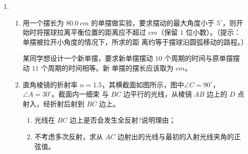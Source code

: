 \begin{enumerate}
\begin{enumerate}
\end{enumerate}





\newpage



\item 
\begin{enumerate}
\item
用一个摆长为 $ 80.0 \ cm $ 的单摆做实验，要求摆动的最大角度小于 $ 5 ^{ \circ } $，则开始时将摆球拉离平衡位置的距离应不超过 \underlinegap $ cm $（保留 $ 1 $ 位小数）。（提示：单摆被拉开小角度的情况下，所求的距
离约等于摆球沿圆弧移动的路程。）

某同学想设计一个新单摆，要求新单摆摆动 $ 10 $ 个周期的时间与原单摆摆动 $ 11 $ 个周期的时间相等。新
单摆的摆长应该取为 \underlinegap $ cm $。






\item 
直角棱镜的折射率 $ n=1.5 $，其横截面如图所示，图中$ \angle C=90 ^{ \circ } $，$ \angle A=30 ^{ \circ } $。截面内一细束
与 $ BC $ 边平行的光线，从棱镜 $ AB $ 边上的 $ D $ 点射入，经折射后射到 $ BC $ 边上。
\begin{enumerate}
\item
光线在 $ BC $ 边上是否会发生全反射?说明理由；
\item 
不考虑多次反射，求从 $ AC $ 边射出的光线与最初的入射光线夹角的正弦值。
\end{enumerate}
\begin{figure}[h!]
\flushright

\end{figure}


\end{enumerate}
\end{enumerate}
